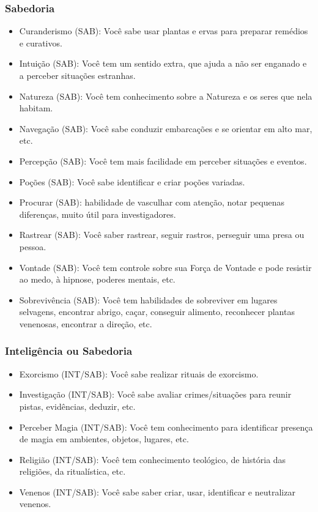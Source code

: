 \subsubsection*{Sabedoria}
\begin{itemize}
	\item Curanderismo (SAB): Você sabe usar plantas e ervas para preparar remédios e curativos.
	\item Intuição (SAB): Você tem um sentido extra, que ajuda a não ser enganado e a perceber situações estranhas.
	\item Natureza (SAB): Você tem conhecimento sobre a Natureza e os seres que nela habitam.
	\item Navegação (SAB): Você sabe conduzir embarcações e se orientar em alto mar, etc.
	\item Percepção (SAB): Você tem mais facilidade em perceber situações e eventos.
	\item Poções (SAB): Você sabe identificar e criar poções variadas.
	\item Procurar (SAB): habilidade de vasculhar com atenção, notar pequenas diferenças, muito útil para investigadores.
	\item Rastrear (SAB): Você saber rastrear, seguir rastros, perseguir uma presa ou pessoa.
	\item Vontade (SAB): Você tem controle sobre sua Força de Vontade e pode resistir ao medo, à hipnose, poderes mentais, etc.
	\item Sobrevivência (SAB): Você tem habilidades de sobreviver em lugares selvagens, encontrar abrigo, caçar, conseguir alimento, reconhecer plantas venenosas, encontrar a direção, etc.
\end{itemize}
	
\subsubsection*{Inteligência ou Sabedoria}
\begin{itemize}
	\item Exorcismo (INT/SAB): Você sabe realizar rituais de exorcismo.
	\item Investigação (INT/SAB): Você sabe avaliar crimes/situações para reunir pistas, evidências, deduzir, etc.
	\item Perceber Magia (INT/SAB): Você tem conhecimento para identificar presença de magia em ambientes, objetos, lugares, etc.
	\item Religião (INT/SAB): Você tem conhecimento teológico, de história das religiões, da ritualística, etc.
	\item Venenos (INT/SAB): Você sabe saber criar, usar, identificar e neutralizar venenos.
\end{itemize}

